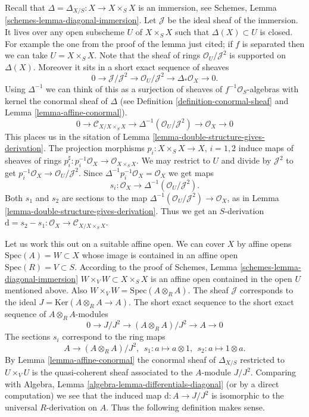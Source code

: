 \medskip\noindent
Recall that $\Delta = \Delta_{X/S} : X \to X \times_S X$
is an immersion, see Schemes, Lemma \ref{schemes-lemma-diagonal-immersion}.
Let $\mathcal{J}$ be the ideal sheaf of the immersion.
It lives over any open subscheme $U$ of $X \times_S X$
such that $\Delta(X) \subset U$ is closed. For example the one from
the proof of the lemma just cited;
if $f$ is separated then we can take $U = X \times_S X$.
Note that the sheaf of rings $\mathcal{O}_U/\mathcal{J}^2$
is supported on $\Delta(X)$. Moreover it sits in a
short exact sequence of sheaves
$$
0 \to \mathcal{J}/\mathcal{J}^2
\to \mathcal{O}_U/\mathcal{J}^2
\to \Delta_*\mathcal{O}_X
\to 0.
$$
Using $\Delta^{-1}$ we can think of this as a surjection of
sheaves of $f^{-1}\mathcal{O}_S$-algebras with kernel the
conormal sheaf of $\Delta$ (see Definition \ref{definition-conormal-sheaf}
and Lemma \ref{lemma-affine-conormal}).
$$
0 \to \mathcal{C}_{X/X\times_SX}
\to \Delta^{-1}(\mathcal{O}_U/\mathcal{J}^2)
\to \mathcal{O}_X
\to 0
$$
This places us in the sitation of
Lemma \ref{lemma-double-structure-gives-derivation}.
The projection morphisms $p_i : X \times_S X \to X$, $i = 1, 2$ induce
maps of sheaves of rings
$p_i^\sharp : p_i^{-1}\mathcal{O}_X \to \mathcal{O}_{X\times_S X}$.
We may restrict to $U$ and divide by $\mathcal{J}^2$ to get
$p_i^{-1}\mathcal{O}_X \to \mathcal{O}_U/\mathcal{J}^2$.
Since $\Delta^{-1}p_i^{-1}\mathcal{O}_X = \mathcal{O}_X$
we get maps
$$
s_i : \mathcal{O}_X \to \Delta^{-1}(\mathcal{O}_U/\mathcal{J}^2).
$$
Both $s_1$ and $s_2$ are sections to the map
$\Delta^{-1}(\mathcal{O}_U/\mathcal{J}^2) \to \mathcal{O}_X$,
as in Lemma \ref{lemma-double-structure-gives-derivation}.
Thus we get an $S$-derivation
$\text{d} = s_2 - s_1 : \mathcal{O}_X \to \mathcal{C}_{X/X\times_SX}$.

\medskip\noindent
Let us work this out on a suitable affine open.
We can cover $X$ by affine opens $\text{Spec}(A) = W \subset X$
whose image is contained in an affine open $\text{Spec}(R) = V \subset S$.
According to the proof of Schemes, Lemma \ref{schemes-lemma-diagonal-immersion}
$W \times_V W \subset X \times_S X$ is an affine open
contained in the open $U$ mentioned above. Also
$W \times_V W = \text{Spec}(A \otimes_R A)$.
The sheaf $\mathcal{J}$ corresponds to the ideal
$J = \text{Ker}(A \otimes_R A \to A)$.
The short exact sequence to the short exact sequence
of $A \otimes_R A$-modules
$$
0 \to J/J^2 \to (A \otimes_R A)/J^2 \to A \to 0
$$
The sections $s_i$ correspond to the ring maps
$$
A \longrightarrow (A \otimes_R A)/J^2, \ \ 
s_1 : a \mapsto a \otimes 1, \ \ 
s_2 : a \mapsto 1 \otimes a.
$$
By Lemma \ref{lemma-affine-conormal} the conormal sheaf
of $\Delta_{X/S}$ restricted
to $U \times_V U$ is the quasi-coherent sheaf associated to the
$A$-module $J/J^2$. Comparing with
Algebra, Lemma \ref{algebra-lemma-differentials-diagonal}
(or by a direct computation)
we see that the induced map $\text{d} : A \to J/J^2$
is isomorphic to the universal $R$-derivation on $A$.
Thus the following definition makes sense.

